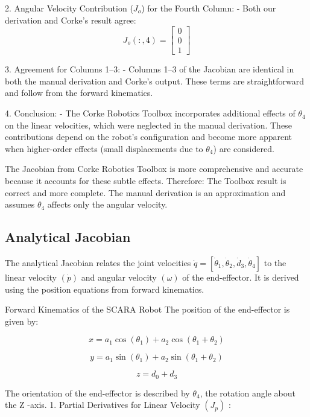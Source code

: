 \documentclass[12pt]{report}
\begin{document}
2. Angular Velocity Contribution (\(J_o\)) for the Fourth Column:
- Both our derivation and Corke's result agree:
\[
J_o(:,4) =
\begin{bmatrix}
	0 \\ 0 \\ 1
\end{bmatrix}
\]

3. Agreement for Columns 1–3:
- Columns 1–3 of the Jacobian are identical in both the manual derivation and Corke's output. These terms are straightforward and follow from the forward kinematics.

4. Conclusion:
- The Corke Robotics Toolbox incorporates additional effects of \(\theta_4\) on the linear velocities, which were neglected in the manual derivation. These contributions depend on the robot's configuration and become more apparent when higher-order effects (small displacements due to \(\theta_4\)) are considered.

The Jacobian from Corke Robotics Toolbox is more comprehensive and accurate because it accounts for these subtle effects. Therefore:
The Toolbox result is correct and more complete.
The manual derivation is an approximation and assumes \(\theta_4\) affects only the angular velocity.

\subsection{Analytical Jacobian}
The analytical Jacobian relates the joint velocities $\dot{q}=\left[\dot{\theta}_1, \dot{\theta}_2, \dot{d}_3, \dot{\theta}_4\right]$ to the linear velocity $(\dot{p})$ and angular velocity $(\omega)$ of the end-effector. It is derived using the position equations from forward kinematics.

Forward Kinematics of the SCARA Robot
The position of the end-effector is given by:

\begin{equation}
	x = a_1 \cos \left(\theta_1\right) + a_2 \cos \left(\theta_1 + \theta_2\right)
\end{equation}

\begin{equation}
	y = a_1 \sin \left(\theta_1\right) + a_2 \sin \left(\theta_1 + \theta_2\right)
\end{equation}

\begin{equation}
	z = d_0 + d_3
\end{equation}


The orientation of the end-effector is described by $\theta_4$, the rotation angle about the Z -axis.
1. Partial Derivatives for Linear Velocity $\left(J_p\right)$ :
\end{document}
